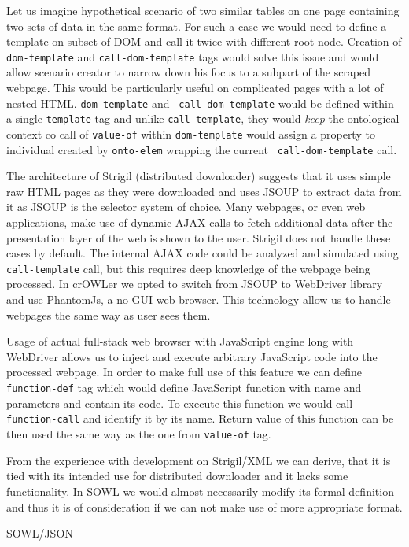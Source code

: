 Let us imagine hypothetical scenario of two similar tables on one page
containing two sets of data in the same format. For such a case we would need
to define a template on subset of DOM and call it twice with different root
node. Creation of {\tt dom-template} and {\tt call-dom-template} tags would
solve this issue and would allow scenario creator to narrow down his focus to a
subpart of the scraped webpage. This would be particularly useful on
complicated pages with a lot of nested HTML. {\tt dom-template} and {\tt
call-dom-template} would be defined within a single {\tt template} tag and
unlike {\tt call-template}, they would {\em keep} the ontological context co
call of {\tt value-of} within {\tt dom-template} would assign a property to
individual created by {\tt onto-elem} wrapping the current {\tt
call-dom-template} call. 

The architecture of Strigil (distributed downloader) suggests that it uses
simple raw HTML pages as they were downloaded and uses JSOUP to extract data
from it as JSOUP is the selector system of choice. Many webpages, or even web
applications, make use of dynamic AJAX calls to fetch additional data after the
presentation layer of the web is shown to the user. Strigil does not handle
these cases by default. The internal AJAX code could be analyzed and simulated
using {\tt call-template} call, but this requires deep knowledge of the webpage
being processed. In crOWLer we opted to switch from JSOUP to WebDriver library
and use PhantomJs, a no-GUI web browser. This technology allow us to handle
webpages the same way as user sees them. 

Usage of actual full-stack web browser with JavaScript engine long with
WebDriver allows us to inject and execute arbitrary JavaScript code into the
processed webpage. In order to make full use of this feature we can define {\tt
function-def} tag which would define JavaScript function with name and
parameters and contain its code. To execute this function we would call {\tt
function-call} and identify it by its name. Return value of this function can
be then used the same way as the one from {\tt value-of} tag. 

From the experience with development on Strigil/XML we can derive, that it is
tied with its intended use for distributed downloader and it lacks some
functionality. In SOWL we would almost necessarily modify its formal definition
and thus it is of consideration if we can not make use of more appropriate
format. 

\secc SOWL/JSON

